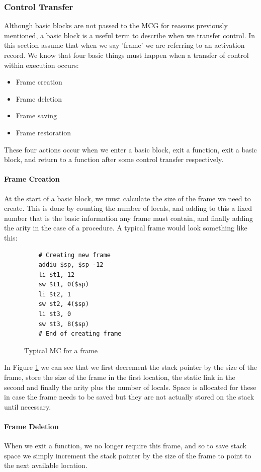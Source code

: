 \documentclass[12pt]{article}
\begin{document}
\subsubsection{Control Transfer}
Although basic blocks are not passed to the MCG for reasons previously mentioned, a basic block is a useful term to describe when we transfer control. In this section assume that when we say 'frame' we are referring to an activation record. We know that four basic things must happen when a transfer of control within execution occurs:
\begin{itemize}
  \item Frame creation 
  \item Frame deletion
  \item Frame saving
  \item Frame restoration
\end{itemize} 
These four actions occur when we enter a basic block, exit a function, exit a basic block, and return to a function after some control transfer respectively.
\paragraph{Frame Creation} At the start of a basic block, we must calculate the size of the frame we need to create. This is done by counting the number of locals, and adding to this a fixed number that is the basic information any frame must contain, and finally adding the arity in the case of a procedure. A typical frame would look something like this: 
\begin{figure}[H]
  \begin{verbatim}
    # Creating new frame
    addiu $sp, $sp -12
    li $t1, 12
    sw $t1, 0($sp)
    li $t2, 1
    sw $t2, 4($sp)
    li $t3, 0
    sw $t3, 8($sp)
    # End of creating frame
  \end{verbatim}
  \caption{Typical MC for a frame}
  \label{mcgenframe}
\end{figure}
In Figure \ref{mcgenframe} we can see that we first decrement the stack pointer by the size of the frame, store the size of the frame in the first location, the static link in the second and finally the arity plus the number of locals. Space is allocated for these in case the frame needs to be saved but they are not actually stored on the stack until necessary.

\paragraph{Frame Deletion} When we exit a function, we no longer require this frame, and so to save stack space we simply increment the stack pointer by the size of the frame to point to the next available location.
\end{document}
